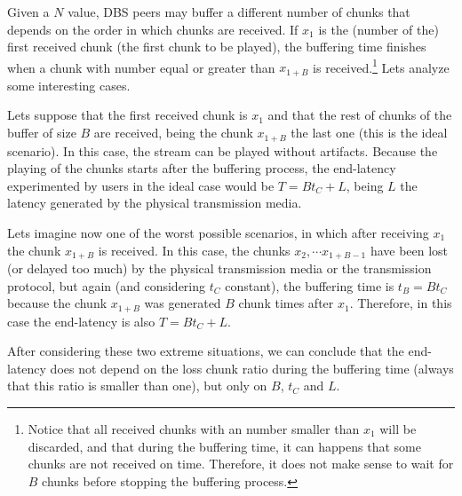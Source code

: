Given a $N$ value, DBS peers may buffer a different number of chunks
that depends on the order in which chunks are received. If $x_1$ is
the (number of the) first received chunk (the first chunk to be
played), the buffering time finishes when a chunk with number equal or
greater than $x_{1+B}$ is received.\footnote{Notice that all received
  chunks with an number smaller than $x_1$ will be discarded, and that
  during the buffering time, it can happens that some chunks are not
  received on time. Therefore, it does not make sense to wait for $B$
  chunks before stopping the buffering process.} Lets analyze some
interesting cases.

Lets suppose that the first received chunk is $x_1$ and that the rest
of chunks of the buffer of size $B$ are received, being the chunk
$x_{1+B}$ the last one (this is the ideal scenario). In this case, the
stream can be played without artifacts. Because the playing of the
chunks starts after the buffering process, the end-latency
experimented by users in the ideal case would be $T=Bt_C+L$, being $L$
the latency generated by the physical transmission media.

Lets imagine now one of the worst possible scenarios, in which after
receiving $x_1$ the chunk $x_{1+B}$ is received. In this case, the
chunks $x_2, \cdots x_{1+B-1}$ have been lost (or delayed too much) by
the physical transmission media or the transmission protocol, but
again (and considering $t_C$ constant), the buffering time is $t_B=Bt_C$
because the chunk $x_{1+B}$ was generated $B$ chunk times after
$x_1$. Therefore, in this case the end-latency is also $T=Bt_C+L$.

After considering these two extreme situations, we can conclude that
the end-latency does not depend on the loss chunk ratio during the
buffering time (always that this ratio is smaller than one), but only
on $B$, $t_C$ and $L$.


\begin{comment}
An heuristic that
works is the described in the Fig.~\ref{fig:DBS_peer_buffering}. As
can be seen, $\text{chunk\_to\_play}$ points to the first received
chunk, that not necessary is the received chunk with lower
index. After that, the
buffering finishes when a chunk with index $\text{chunk\_to\_play} +
\text{BUFFER\_SIZE}/2$ has been received.\footnote{This not means that
  $\text{BUFFER\_SIZE}/2$ chunks are available in the buffer.}
\end{comment}
